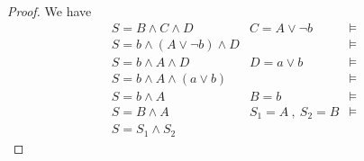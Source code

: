 \documentclass[runningheads,a4paper]{llncs}
\begin{document}
\begin{proof}

We have
\begin{equation}
\begin{array}{ccc}
S  =  B\wedge C\wedge D              &C=A\vee \neg b &  \models\\
S  =  b\wedge (A\vee \neg b)\wedge D &           & \models\\
S  =  b\wedge A\wedge D              & D=a\vee b & \models\\
S  =  b\wedge A\wedge (a\vee b)      &           & \models\\
S  =  b\wedge A                      & B=b       & \models\\
S  =  B\wedge A                      &S_1=A~,~S_2=B& \models\\
S  =  S_1 \wedge S_2                 &           & 
\end{array}
\end{equation}


\end{proof}


% 
% 
\end{document}
